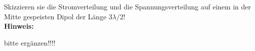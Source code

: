 \begin{question}[section=11,name={Strom und Spannungsverteilung 1},difficulty=,quantity=1,type=thr,tags={}]
	Skizzieren sie die Stromverteilung und die Spannungsverteilung auf einem in der Mitte gespeisten Dipol der Länge $3\lambda/2$! 
	\\ \textbf{Hinweis:}\\
	
\end{question}
\begin{solution}
	bitte ergänzen!!!!
\end{solution}
